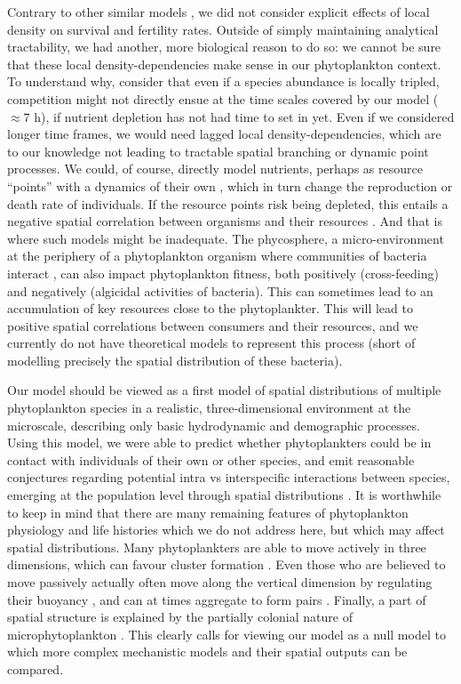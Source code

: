 \documentclass[12pt,english]{article}
\begin{document}
Contrary to other similar models \citep[e.g.,][]{birch_master_2006,bouderbala_3d_2018},
we did not consider explicit effects of local density on survival
and fertility rates. Outside of simply maintaining analytical tractability,
we had another, more biological reason to do so: we cannot be sure
that these local density-dependencies make sense in our phytoplankton
context. To understand why, consider that even if a species abundance
is locally tripled, competition might not directly ensue at the time
scales covered by our model ($\approx7$ h), if nutrient depletion
has not had time to set in yet. Even if we considered longer time
frames, we would need lagged local density-dependencies, which are
to our knowledge not leading to tractable spatial branching or dynamic
point processes. We could, of course, directly model nutrients, perhaps
as resource ``points'' with a dynamics of their own \citep{murrell_local_2005,north_interactions_2007},
which in turn change the reproduction or death rate of individuals.
If the resource points risk being depleted, this entails a negative
spatial correlation between organisms and their resources \citep{murrell_local_2005,barraquand2012evolutionarily}.
And that is where such models might be inadequate. The phycosphere,
a micro-environment at the periphery of a phytoplankton organism where
communities of bacteria interact \citep{seymour_zooming_2017}, can
also impact phytoplankton fitness, both positively (cross-feeding)
and negatively (algicidal activities of bacteria). This can sometimes
lead to an accumulation of key resources close to the phytoplankter.
This will lead to positive spatial correlations between consumers
and their resources, and we currently do not have theoretical models
to represent this process (short of modelling precisely the spatial
distribution of these bacteria).

Our model should be viewed as a first model of spatial distributions
of multiple phytoplankton species in a realistic, three-dimensional
environment at the microscale, describing only basic hydrodynamic
and demographic processes. Using this model, we were able to predict
whether phytoplankters could be in contact with individuals of their
own or other species, and emit reasonable conjectures regarding potential
intra vs interspecific interactions between species, emerging at the
population level through spatial distributions \citep{detto_stabilization_2016}.
It is worthwhile to keep in mind that there are many remaining features
of phytoplankton physiology and life histories which we do not address
here, but which may affect spatial distributions. Many phytoplankters
are able to move actively in three dimensions, which can favour cluster
formation \citep{breier_emergence_2018}. Even those who are believed
to move passively actually often move along the vertical dimension
by regulating their buoyancy \citep{reynolds2006ecology}, and can
at times aggregate to form pairs \citep{font-munoz_collective_2019}.
Finally, a part of spatial structure is explained by the partially
colonial nature of microphytoplankton \citep{kiorboe_coagulation_1990}.
This clearly calls for viewing our model as a null model to which
more complex mechanistic models and their spatial outputs can be compared.
\end{document}
